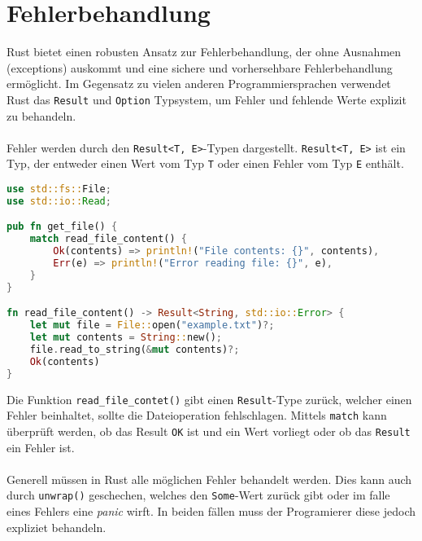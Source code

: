 \chapter{Fehlerbehandlung}
Rust bietet einen robusten Ansatz zur Fehlerbehandlung, der ohne Ausnahmen (\glspl{exception}) auskommt und eine sichere und vorhersehbare Fehlerbehandlung ermöglicht. 
Im Gegensatz zu vielen anderen Programmiersprachen verwendet Rust das \texttt{Result} und \texttt{Option} Typsystem, um Fehler und fehlende Werte explizit zu behandeln.\\
\\
Fehler werden durch den \texttt{Result<T, E>}-Typen dargestellt. 
\texttt{Result<T, E>} ist ein Typ, der entweder einen Wert vom Typ \texttt{T} oder einen Fehler vom Typ \texttt{E} enthält. 

\begin{lstlisting}[language=Rust, caption=Sichere Fehlerbehandlung]
use std::fs::File;
use std::io::Read;

pub fn get_file() {
    match read_file_content() {
        Ok(contents) => println!("File contents: {}", contents),
        Err(e) => println!("Error reading file: {}", e),
    }
}

fn read_file_content() -> Result<String, std::io::Error> {
    let mut file = File::open("example.txt")?;
    let mut contents = String::new();
    file.read_to_string(&mut contents)?;
    Ok(contents)
}
\end{lstlisting}
\noindent
Die Funktion \texttt{read\_file\_contet()} gibt einen \texttt{Result}-Type zurück, welcher einen Fehler beinhaltet, sollte die Dateioperation fehlschlagen.
Mittels \texttt{match} kann überprüft werden, ob das Result \texttt{OK} ist und ein Wert vorliegt oder ob das \texttt{Result} ein Fehler ist.\\
\\
Generell müssen in Rust alle möglichen Fehler behandelt werden.
Dies kann auch durch \texttt{unwrap()} geschechen, welches den \texttt{Some}-Wert zurück gibt oder im falle eines Fehlers eine \textit{\gls{panic}} wirft.
In beiden fällen muss der Programierer diese jedoch expliziet behandeln.
